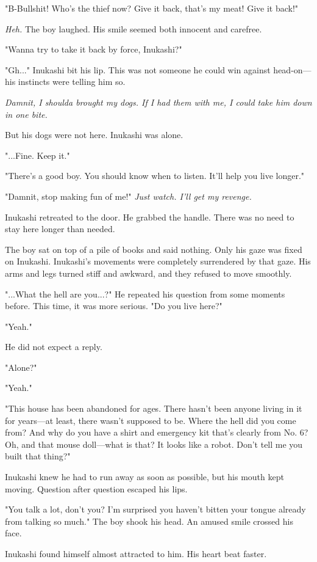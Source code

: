 "B-Bullshit! Who's the thief now? Give it back, that's my meat! Give it
back!"

\emph{Heh.} The boy laughed. His smile seemed both innocent and carefree.

"Wanna try to take it back by force, Inukashi?"

"Gh..." Inukashi bit his lip. This was not someone he could win against
head-on---his instincts were telling him so.

\emph{Damnit, I shoulda brought my dogs. If I had them with me, I could take
him down in one bite.}

But his dogs were not here. Inukashi was alone.

"...Fine. Keep it."

"There's a good boy. You should know when to listen. It'll help you live
longer."

"Damnit, stop making fun of me!" \emph{Just watch. I'll get my revenge.}

Inukashi retreated to the door. He grabbed the handle. There was no need
to stay here longer than needed.

The boy sat on top of a pile of books and said nothing. Only his gaze
was fixed on Inukashi. Inukashi's movements were completely surrendered
by that gaze. His arms and legs turned stiff and awkward, and they
refused to move smoothly.

"...What the hell are you...?" He repeated his question from some
moments before. This time, it was more serious. "Do you live here?"

"Yeah."

He did not expect a reply.

"Alone?"

"Yeah."

"This house has been abandoned for ages. There hasn't been anyone living
in it for years---at least, there wasn't supposed to be. Where the hell
did you come from? And why do you have a shirt and emergency kit that's
clearly from No. 6? Oh, and that mouse doll---what is that? It looks like
a robot. Don't tell me you built that thing?"

Inukashi knew he had to run away as soon as possible, but his mouth kept
moving. Question after question escaped his lips.

"You talk a lot, don't you? I'm surprised you haven't bitten your tongue
already from talking so much." The boy shook his head. An amused smile
crossed his face.

Inukashi found himself almost attracted to him. His heart beat faster.

